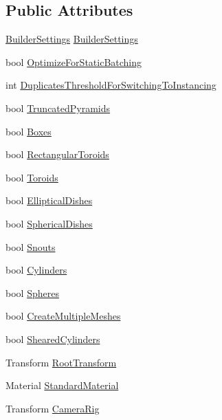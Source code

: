 \subsection*{Public Attributes}
\begin{DoxyCompactItemize}
\item 
\mbox{\hyperlink{class_builder_settings}{Builder\+Settings}} \mbox{\hyperlink{class_scene_shapes_instantiator_a0cff8be70f96b6cb4dd334746f26820d}{Builder\+Settings}}
\item 
bool \mbox{\hyperlink{class_scene_shapes_instantiator_adfa3657bf47b83545fe33125c44e6699}{Optimize\+For\+Static\+Batching}}
\item 
int \mbox{\hyperlink{class_scene_shapes_instantiator_a05616961895590145e6c8052e076ebe4}{Duplicates\+Threshold\+For\+Switching\+To\+Instancing}}
\item 
bool \mbox{\hyperlink{class_scene_shapes_instantiator_a96b27a2b4d7a93b85ebd729a97e46534}{Truncated\+Pyramids}}
\item 
bool \mbox{\hyperlink{class_scene_shapes_instantiator_aa75cb20d2257e125bd3b612b952221f3}{Boxes}}
\item 
bool \mbox{\hyperlink{class_scene_shapes_instantiator_a07f459ad1e64db267fa57997217fd2d1}{Rectangular\+Toroids}}
\item 
bool \mbox{\hyperlink{class_scene_shapes_instantiator_a5f5ceca041209707a86caa15ca750a1c}{Toroids}}
\item 
bool \mbox{\hyperlink{class_scene_shapes_instantiator_a9447b1da7403dc2f4f8bfe3a15e3099b}{Elliptical\+Dishes}}
\item 
bool \mbox{\hyperlink{class_scene_shapes_instantiator_a54a180399d20c2c18b2612dfced1940a}{Spherical\+Dishes}}
\item 
bool \mbox{\hyperlink{class_scene_shapes_instantiator_ae236a8a90784d7a5480f1b3a179d6bbd}{Snouts}}
\item 
bool \mbox{\hyperlink{class_scene_shapes_instantiator_a7bdf6dc22f0852bdaaab0c22a884295b}{Cylinders}}
\item 
bool \mbox{\hyperlink{class_scene_shapes_instantiator_a12b50389cab084fa06b3b29cb4be19a3}{Spheres}}
\item 
bool \mbox{\hyperlink{class_scene_shapes_instantiator_adb8dd376dc5df27675120c149153d394}{Create\+Multiple\+Meshes}}
\item 
bool \mbox{\hyperlink{class_scene_shapes_instantiator_ad0f5a1c1d12b5eacd5b07ef5fe0cfeb5}{Sheared\+Cylinders}}
\item 
Transform \mbox{\hyperlink{class_scene_shapes_instantiator_ad947fac74cbe83b3acc39baab51625c2}{Root\+Transform}}
\item 
Material \mbox{\hyperlink{class_scene_shapes_instantiator_a340b257c6f9383dceb8e9bbb0f1cf3a3}{Standard\+Material}}
\item 
Transform \mbox{\hyperlink{class_scene_shapes_instantiator_a25a71700c5aa269c03bf5921acc43bb6}{Camera\+Rig}}
\end{DoxyCompactItemize}
